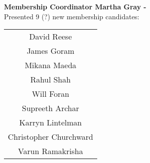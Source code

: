 \documentclass[10pt,a4paper]{article}
\begin{document}
\begin{multicols}{2}
\textbf{Membership Coordinator Martha Gray - } \\
Presented 9 (?) new membership candidates:
\begin{center}
	\begin{tabular}{c}
David Reese\\ 
James Goram\\ 
Mikana Maeda\\ 
Rahul Shah\\
Will Foran\\
Supreeth Archar\\
Karryn Lintelman\\
Christopher Churchward\\
Varun Ramakrisha
	\end{tabular}
\end{center}


\end{multicols}
\end{document}
